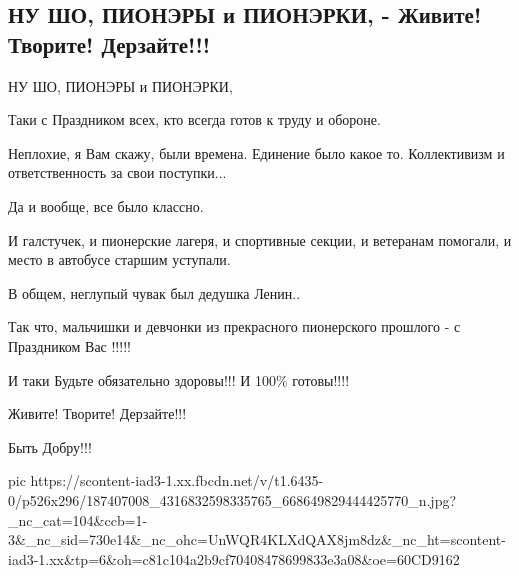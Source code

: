  
 
 
 
 

\subsection{НУ ШО, ПИОНЭРЫ и ПИОНЭРКИ, - Живите! Творите! Дерзайте!!!}
\label{sec:19_05_2021.fb.spivak_dmitrij.1.pioner_lenin_dobro}

НУ ШО, ПИОНЭРЫ и ПИОНЭРКИ, 

Таки с Праздником всех, кто всегда готов к труду и обороне. 

Неплохие, я Вам скажу, были времена. Единение было какое то. Коллективизм и
ответственность за свои поступки... 

Да и вообще, все было классно. 

И галстучек, и пионерские лагеря, и спортивные секции, и ветеранам помогали, и
место в автобусе старшим уступали. 

В общем, неглупый чувак был дедушка Ленин.. 

Так что, мальчишки и девчонки из прекрасного пионерского прошлого - с
Праздником Вас !!!!! 

И таки Будьте обязательно здоровы!!! И 100\% готовы!!!! 

Живите! Творите! Дерзайте!!! 

Быть Добру!!!

\ifcmt
  pic https://scontent-iad3-1.xx.fbcdn.net/v/t1.6435-0/p526x296/187407008_4316832598335765_668649829444425770_n.jpg?_nc_cat=104&ccb=1-3&_nc_sid=730e14&_nc_ohc=UnWQR4KLXdQAX8jm8dz&_nc_ht=scontent-iad3-1.xx&tp=6&oh=c81c104a2b9cf70408478699833e3a08&oe=60CD9162
\fi

